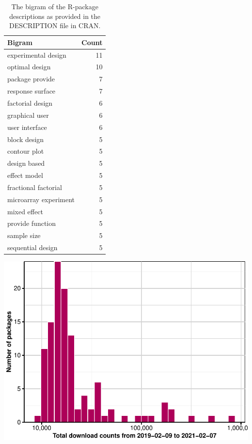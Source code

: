 \begin{Schunk}
\begin{table}

\caption{\label{tab:bigram-desc}The bigram of the R-package descriptions as provided in the DESCRIPTION file in CRAN.}
\centering
\begin{tabular}[t]{lr}
\toprule
Bigram & Count\\
\midrule
experimental design & 11\\
optimal design & 10\\
package provide & 7\\
response surface & 7\\
factorial design & 6\\
graphical user & 6\\
user interface & 6\\
block design & 5\\
contour plot & 5\\
design based & 5\\
effect model & 5\\
fractional factorial & 5\\
microarray experiment & 5\\
mixed effect & 5\\
provide function & 5\\
sample size & 5\\
sequential design & 5\\
\bottomrule
\end{tabular}
\end{table}

\end{Schunk}

\begin{Schunk}


\begin{center}\includegraphics{paper_files/figure-latex/download-hist-1} \end{center}

\end{Schunk}

